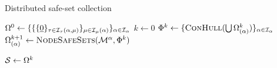 \begin{algorithm}[t]
\caption{Distributed safe-set collection}\label{alg:safe_sets}
\begin{algorithmic}[1]
\State $\Omega^0\gets\{\{\{\underline{0}\}_{\tau\in\mathcal{I}_\tau(\alpha,{\mu})}\}_{{\mu}\in\mathcal{I}_{\mu}(\alpha)}\}_{\alpha\in\mathcal{I}_{\alpha}}$
\State $k\gets0$
\Repeat 
	\State $\Phi^k\gets\{\Call{ConHull}{\bigcup\Omega^k_{(\agentidx)}}\}_{\agentidx\in\mathcal{I}_\agentidx}$
		\State $\Omega^{k+1}_{(\agentidx)}\gets\Call{NodeSafeSets}{\modes[\agentidx], \Phi^k}$
	\EndFor
{}

\State $\mathcal{S}\gets\Omega^k$
\EndProcedure
\end{algorithmic}
\end{algorithm}
